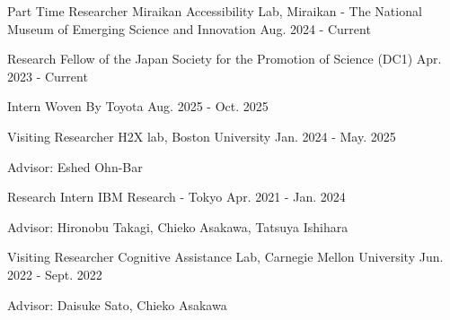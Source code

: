 
\begin{cventries}

  \cventry
    {Part Time Researcher}
    {Miraikan Accessibility Lab, Miraikan - The National Museum of Emerging Science and Innovation}
    {}
    {Aug. 2024 - Current}
    {}

  \cventry
    {Research Fellow of the Japan Society for the Promotion of Science (DC1)}
    {}
    {}
    {Apr. 2023 - Current}
    {}

  \cventry
    {Intern}
    {Woven By Toyota}
    {}
    {Aug. 2025 - Oct. 2025}
    {}

  \cventry
    {Visiting Researcher}
    {H2X lab, Boston University}
    {}
    {Jan. 2024 - May. 2025}
    {
      \begin{cvitems}
        \item {Advisor: Eshed Ohn-Bar}
      \end{cvitems}
    }

  \cventry
    {Research Intern}
    {IBM Research - Tokyo}
    {}
    {Apr. 2021 - Jan. 2024}
    {
      \begin{cvitems}
        \item {Advisor: Hironobu Takagi, Chieko Asakawa, Tatsuya Ishihara}
      \end{cvitems}
    }

  \cventry
    {Visiting Researcher}
    {Cognitive Assistance Lab, Carnegie Mellon University}
    {}
    {Jun. 2022 - Sept. 2022}
    {
      \begin{cvitems}
        \item {Advisor: Daisuke Sato, Chieko Asakawa}
      \end{cvitems}
    }

\end{cventries}

